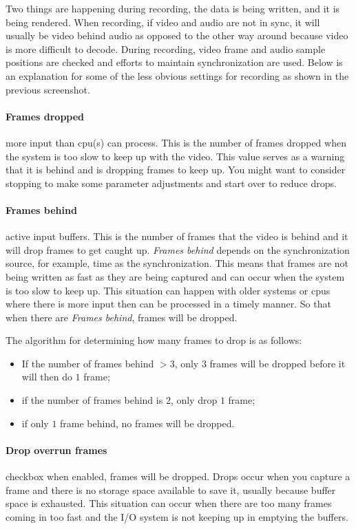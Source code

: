 Two things are happening during recording, the data is being written, and it is being rendered.  When recording, if video and audio are not in sync, it will usually be video behind audio as opposed to the other way around because video is more difficult to decode.  During recording, video frame and audio sample positions are checked and efforts to maintain synchronization are used.   Below is an explanation for some of the less obvious settings for recording as shown in the previous screenshot.
\paragraph{Frames dropped} more input than cpu(s) can process.  This is the number of frames dropped when the system is too slow to keep up with the video.  This value serves as a warning that it is behind and is dropping frames to keep up.  You might want to consider stopping to make some parameter adjustments and start over to reduce drops.
\paragraph{Frames behind} active input buffers.  This is the number of frames that the video is behind and it will drop frames to get caught up.  \textit{Frames behind} depends on the synchronization source, for example, time as the synchronization.  This means that frames are not being written as fast as they are being captured and can occur when the system is too slow to keep up.  This situation can happen with older systems or cpus where there is more input then can be processed in a timely manner.  So that when there are \textit{Frames behind}, frames will be dropped.

The algorithm for determining how many frames to drop is as follows:

\begin{itemize}
    \item If the number of frames behind $> 3$, only $3$ frames will be dropped before it will then do $1$ frame;
    \item if the number of frames behind is $2$, only drop $1$ frame;
    \item if only $1$ frame behind, no frames will be dropped.
\end{itemize}
\paragraph{Drop overrun frames} checkbox when enabled, frames will be dropped.  Drops occur when you capture a frame and there is no storage space available to save it, usually because buffer space is exhausted.  This situation can occur when there are too many frames coming in too fast and the I/O system is not keeping up in emptying the buffers.
